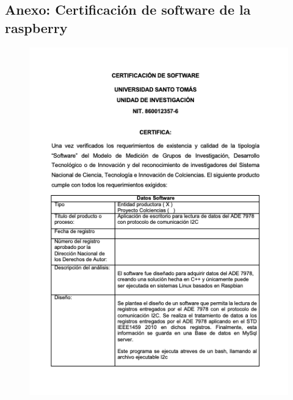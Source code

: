 \begin{appendix}

\chapter{ Anexo: Certificación de software de la raspberry}
\begin{figure}[H]
    \centering
    \includegraphics[width = 14cm]{Anexos/raspberry-1.png}
    \label{fig:raspberry1}
\end{figure}
\begin{figure}[H]
    \centering

\end{figure}
\end{appendix}
